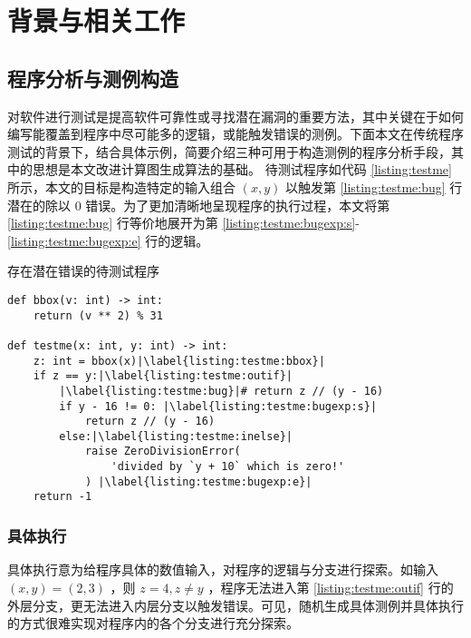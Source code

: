 
\chapter{背景与相关工作}
\label{chp:bg}

\section{程序分析与测例构造}

对软件进行测试是提高软件可靠性或寻找潜在漏洞的重要方法，其中关键在于如何编写能覆盖到程序中尽可能多的逻辑，或能触发错误的测例。下面本文在传统程序测试的背景下，结合具体示例，简要介绍三种可用于构造测例的程序分析手段，其中的思想是本文改进计算图生成算法的基础。
待测试程序如代码 \ref{listing:testme} 所示，本文的目标是构造特定的输入组合 $(x, y)$ 以触发第 \ref{listing:testme:bug} 行潜在的除以 0 错误。为了更加清晰地呈现程序的执行过程，本文将第 \ref{listing:testme:bug} 行等价地展开为第 \ref{listing:testme:bugexp:s}-\ref{listing:testme:bugexp:e} 行的逻辑。

\begin{listing}[]
    \caption{存在潜在错误的待测试程序}
    \label{listing:testme}
\begin{verbatim}
def bbox(v: int) -> int:
    return (v ** 2) % 31

def testme(x: int, y: int) -> int:
    z: int = bbox(x)|\label{listing:testme:bbox}|
    if z == y:|\label{listing:testme:outif}|
        |\label{listing:testme:bug}|# return z // (y - 16)
        if y - 16 != 0: |\label{listing:testme:bugexp:s}|
            return z // (y - 16)
        else:|\label{listing:testme:inelse}|
            raise ZeroDivisionError(
                'divided by `y + 10` which is zero!'
            ) |\label{listing:testme:bugexp:e}|
    return -1
\end{verbatim}
\end{listing}

\subsection{具体执行}

具体执行意为给程序具体的数值输入，对程序的逻辑与分支进行探索。如输入 $(x, y) = (2, 3)$ ，则 $z = 4, z \neq y$ ，程序无法进入第 \ref{listing:testme:outif} 行的外层分支，更无法进入内层分支以触发错误。可见，随机生成具体测例并具体执行的方式很难实现对程序内的各个分支进行充分探索。


